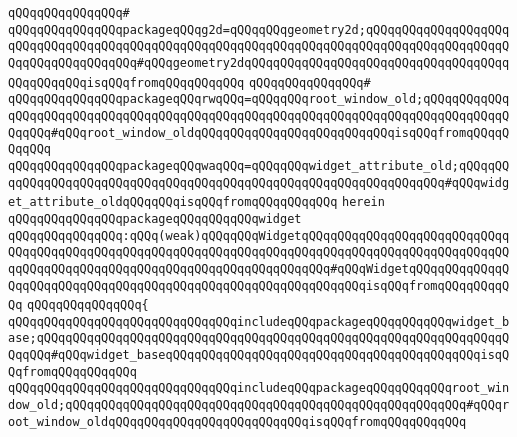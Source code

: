 \verb|qQQqqQQqqQQqqQQq#|\newline
\verb|qQQqqQQqqQQqqQQqpackageqQQqg2d=qQQqqQQqgeometry2d;qQQqqQQqqQQqqQQqqQQqqQQqqQQqqQQqqQQqqQQqqQQqqQQqqQQqqQQqqQQqqQQqqQQqqQQqqQQqqQQqqQQqqQQqqQQqqQQqqQQqqQQqqQQq#qQQqgeometry2dqQQqqQQqqQQqqQQqqQQqqQQqqQQqqQQqqQQqqQQqqQQqqQQqisqQQqfromqQQqqQQqqQQq|\newline
\verb|qQQqqQQqqQQqqQQq#|\newline
\verb|qQQqqQQqqQQqqQQqpackageqQQqrwqQQq=qQQqqQQqroot_window_old;qQQqqQQqqQQqqQQqqQQqqQQqqQQqqQQqqQQqqQQqqQQqqQQqqQQqqQQqqQQqqQQqqQQqqQQqqQQqqQQqqQQqqQQq#qQQqroot_window_oldqQQqqQQqqQQqqQQqqQQqqQQqqQQqisqQQqfromqQQqqQQqqQQq|\newline
\verb|qQQqqQQqqQQqqQQqpackageqQQqwaqQQq=qQQqqQQqwidget_attribute_old;qQQqqQQqqQQqqQQqqQQqqQQqqQQqqQQqqQQqqQQqqQQqqQQqqQQqqQQqqQQqqQQqqQQq#qQQqwidget_attribute_oldqQQqqQQqisqQQqfromqQQqqQQqqQQq|\newline
\verb|herein|\newline
\newline
\verb|qQQqqQQqqQQqqQQqpackageqQQqqQQqqQQqwidget|\newline
\verb|qQQqqQQqqQQqqQQq:qQQq(weak)qQQqqQQqWidgetqQQqqQQqqQQqqQQqqQQqqQQqqQQqqQQqqQQqqQQqqQQqqQQqqQQqqQQqqQQqqQQqqQQqqQQqqQQqqQQqqQQqqQQqqQQqqQQqqQQqqQQqqQQqqQQqqQQqqQQqqQQqqQQqqQQqqQQqqQQqqQQq#qQQqWidgetqQQqqQQqqQQqqQQqqQQqqQQqqQQqqQQqqQQqqQQqqQQqqQQqqQQqqQQqqQQqqQQqisqQQqfromqQQqqQQqqQQq|\newline
\verb|qQQqqQQqqQQqqQQq{|\newline
\verb|qQQqqQQqqQQqqQQqqQQqqQQqqQQqqQQqincludeqQQqpackageqQQqqQQqqQQqwidget_base;qQQqqQQqqQQqqQQqqQQqqQQqqQQqqQQqqQQqqQQqqQQqqQQqqQQqqQQqqQQqqQQqqQQqqQQq#qQQqwidget_baseqQQqqQQqqQQqqQQqqQQqqQQqqQQqqQQqqQQqqQQqqQQqisqQQqfromqQQqqQQqqQQq|\newline
\verb|qQQqqQQqqQQqqQQqqQQqqQQqqQQqqQQqincludeqQQqpackageqQQqqQQqqQQqroot_window_old;qQQqqQQqqQQqqQQqqQQqqQQqqQQqqQQqqQQqqQQqqQQqqQQqqQQqqQQq#qQQqroot_window_oldqQQqqQQqqQQqqQQqqQQqqQQqqQQqisqQQqfromqQQqqQQqqQQq|\newline
